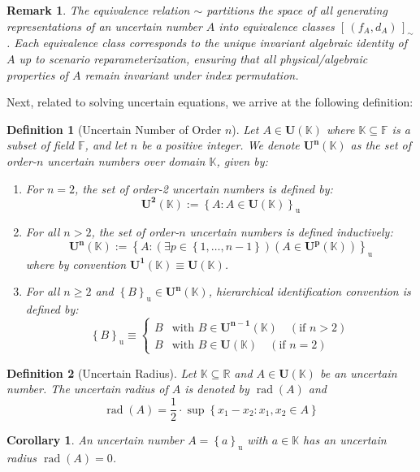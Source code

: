 \documentclass[a4paper,12pt,twoside]{memoir}
\newtheorem{definition}{Definition}[chapter]
\newtheorem{corollary}{Corollary}[chapter]
\newtheorem{remark}{Remark}[chapter]
\DeclareMathOperator{\rad}{rad}
\newcommand{\set}[1]{\left\{#1\right\}} %
\newcommand{\s}[1]{\set{#1}_\mathrm{u}} %
\newcommand{\tsbd}[1]{\mathbf{U}(\mathbb{#1})}
\newcommand{\tsbdcapn}[2]{\mathbf{U^{#2}}(\mathbb{#1})}
\begin{document}
	\begin{remark}
		The equivalence relation $\sim$ partitions the space of all generating representations of an uncertain number $A$ into equivalence classes $[\,(f_A, d_A)\,]_\sim$. Each equivalence class corresponds to the unique invariant algebraic identity of $A$ up to scenario reparameterization, ensuring that all physical/algebraic properties of $A$ remain invariant under index permutation.
	\end{remark}
	Next, related to solving uncertain equations, we arrive at the following definition:
	
	\begin{definition}[Uncertain Number of Order $n$]
		Let $A \in \tsbd{K}$ where $\mathbb{K} \subseteq \mathbb{F}$ is a subset of field $\mathbb{F}$, and let $n$ be a positive integer. We denote $\tsbdcapn{K}{n}$ as the set of order-$n$ uncertain numbers over domain $\mathbb{K}$, given by:
		\begin{enumerate}[leftmargin=*]
			\item For $n = 2$, the set of order-2 uncertain numbers is defined by:
			\[
			\tsbdcapn{K}{2} := \s{A : A \in \tsbd{K}}
			\]
			\item For all $n > 2$, the set of order-$n$ uncertain numbers is defined inductively:
			\[
			\tsbdcapn{K}{n} := \s{A : (\exists p \in \set{1, \dots, n-1})(A \in \tsbdcapn{K}{p})}
			\]
			where by convention $\tsbdcapn{K}{1} \equiv \tsbd{K}$.
			\item For all $n \geq 2$ and $\s{B} \in \tsbdcapn{K}{n}$, hierarchical identification convention is defined by:
			\[
			\s{B} \equiv \begin{cases}
				B & \text{with } B \in \tsbdcapn{K}{n-1} \quad (\text{if } n > 2) \\
				B & \text{with } B \in \tsbd{K} \quad (\text{if } n = 2)
			\end{cases}
			\]
		\end{enumerate}
	\end{definition}
	
	\begin{definition}[Uncertain Radius]
		Let $\mathbb{K} \subseteq \mathbb{R}$ and $A \in \tsbd{K}$ be an uncertain number. The uncertain radius of $A$ is denoted by $\rad(A)$ and
		$$\rad(A) = \frac{1}{2} \cdot \sup \set{x_1 - x_2 : x_1, x_2 \in A}$$
	\end{definition}
	
	\begin{corollary}
		An uncertain number $A = \s{a}$ with $a \in \mathbb{K}$ has an uncertain radius $\rad(A) = 0$.
	\end{corollary}
	
\end{document}
